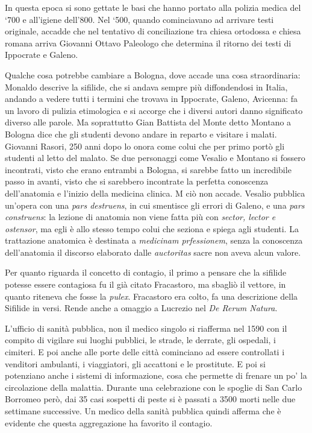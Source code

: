 In questa epoca si sono gettate le basi che hanno portato alla polizia
medica del `700 e all'igiene dell'800. Nel `500, quando cominciavano ad
arrivare testi originale, accadde che nel tentativo di conciliazione tra
chiesa ortodossa e chiesa romana arriva Giovanni Ottavo Paleologo che
determina il ritorno dei testi di Ippocrate e Galeno.

Qualche cosa potrebbe cambiare a Bologna, dove accade una cosa
straordinaria: Monaldo descrive la sifilide, che si andava sempre più
diffondendosi in Italia, andando a vedere tutti i termini che trovava in
Ippocrate, Galeno, Avicenna: fa un lavoro di pulizia etimologica e si
accorge che i diversi autori danno significato diverso alle parole. Ma
soprattutto Gian Battista del Monte detto Montano a Bologna dice che gli
studenti devono andare in reparto e visitare i malati. Giovanni Rasori,
250 anni dopo lo onora come colui che per primo portò gli studenti al
letto del malato. Se due personaggi come Vesalio e Montano si fossero
incontrati, visto che erano entrambi a Bologna, si sarebbe fatto un
incredibile passo in avanti, visto che si sarebbero incontrate la
perfetta conoscenza dell'anatomia e l'inizio della medicina clinica. M
ciò non accade. Vesalio pubblica un'opera con una \emph{pars destruens},
in cui smentisce gli errori di Galeno, e una \emph{pars construens}: la
lezione di anatomia non viene fatta più con \emph{sector, lector e
ostensor}, ma egli è allo stesso tempo colui che seziona e spiega agli
studenti. La trattazione anatomica è destinata a \emph{medicinam
prfessionem}, senza la conoscenza dell'anatomia il discorso elaborato
dalle \emph{auctoritas} sacre non aveva alcun valore.

Per quanto riguarda il concetto di contagio, il primo a pensare che la
sifilide potesse essere contagiosa fu il già citato Fracastoro, ma
sbagliò il vettore, in quanto riteneva che fosse la \emph{pulex}.
Fracastoro era colto, fa una descrizione della Sifilide in versi. Rende
anche a omaggio a Lucrezio nel \emph{De Rerum Natura}.

L'ufficio di sanità pubblica, non il medico singolo si riafferma nel
1590 con il compito di vigilare sui luoghi pubblici, le strade, le
derrate, gli ospedali, i cimiteri. E poi anche alle porte delle città
cominciano ad essere controllati i venditori ambulanti, i viaggiatori,
gli accattoni e le prostitute. E poi si potenziano anche i sistemi di
informazione, cosa che permette di frenare un po' la circolazione della
malattia. Durante una celebrazione con le spoglie di San Carlo Borromeo
però, dai 35 casi sospetti di peste si è passati a 3500 morti nelle due
settimane successive. Un medico della sanità pubblica quindi afferma che
è evidente che questa aggregazione ha favorito il contagio.

